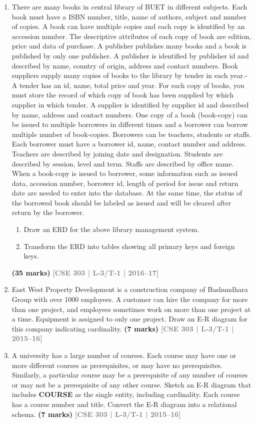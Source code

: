 \documentclass[12pt]{article}
\newcommand{\yr}[1]{\hfill\textcolor{gray}{\small\textbf{[#1]}}}
\newcommand{\mk}[1]{\textcolor{orange!70!black}{\small\textbf{(#1 marks)}}}
\begin{document}
\begin{enumerate}
\item 
There are many books in central library of BUET in different subjects. Each book must
have a ISBN number, title, name of authors, subject and number of copies. A book can
have multiple copies and each copy is identified by an accession number. The
descriptive attributes of each copy of book are edition, price and data of purchase. A
publisher publishes many books and a book is published by only one publisher. A
publisher is identified by publisher id and described by name, country of origin,
address and contact numbers.
Book suppliers supply many copies of books to the library by tender in each year.- A
tender has an id, name, total price and year. For each copy of books, you must store the
record of which copy of book has been supplied by which supplier in which tender. A
supplier is identified by supplier id and described by name, address and contact
numbers.
One copy of a book (book-copy) can be issued to multiple borrowers in different times
and a borrower can borrow multiple number of book-copies. Borrowers can be
teachers, students or staffs. Each borrower must have a borrower id, name, contact
number and address. Teachers are described by joining date and designation. Students
are described by session, level and term. Staffs are described by office name.
When a book-copy is issued to borrower, some information such as issued data,
accession number, borrower id, length of period for issue and return date are needed to
enter into the database. At the same time, the status of the borrowed book should be
labeled as issued and will be cleared after return by the borrower.
\begin{enumerate}
  \item Draw an ERD for the above library management system.
  \item Transform the ERD into tables showing all primary keys and foreign keys.
\end{enumerate}
\mk{35} \yr{CSE 303 | L-3/T-1 | 2016--17}


\item East West Property Development is a construction company of Bashundhara Group with over 1000 employees. A customer can hire the company for more than one project, and employees sometimes work on more than one project at a time. Equipment is assigned to only one project. Draw an E-R diagram for this company indicating cardinality.
\mk{7} \yr{CSE 303 | L-3/T-1 | 2015--16}


\item A university has a large number of courses. Each course may have one or more different courses as prerequisites, or may have no prerequisites. Similarly, a particular course may be a prerequisite of any number of courses or may not be a prerequisite of any other course. Sketch an E-R diagram that includes \textbf{COURSE} as the single entity, including cardinality. Each course has a course number and title. Convert the E-R diagram into a relational schema.
\mk{7} \yr{CSE 303 | L-3/T-1 | 2015--16}



\end{enumerate}
\end{document}
